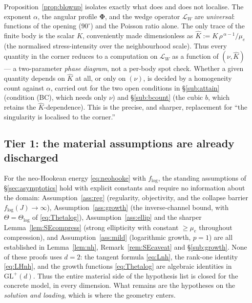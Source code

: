 \begin{remark}
    \label{rem:sifparam}
    Proposition~\ref{prop:blowup} isolates exactly what does and does not localise. The exponent $\alpha$, the angular
    profile $\bm{\Phi}$, and the wedge operator $\mathcal{L}_W$ are \emph{universal}: functions of the opening
    ($90^\circ$) and the Poisson ratio alone. The only trace of the finite body is the scalar $K$, conveniently made
    dimensionless as $\hat K:=K\,\rho^{\,\alpha-1}/\mu_e$ (the normalised stress-intensity over the neighbourhood scale).
    Thus every quantity in the corner reduces to a computation on $\mathcal{L}_W$ as a function of $(\nu,\hat K)$ --- a
    two-parameter \emph{phase diagram}, not a per-body spot check. Whether a given quantity depends on $\hat K$ at all,
    or only on $(\nu)$, is decided by a homogeneity count against $\alpha$, carried out for the two open conditions in
    \S\ref{sub:attain} (condition (BC), which needs only $\nu$) and \S\ref{sub:bcount} (the cubic $b$, which retains the
    $\hat K$-dependence). This is the precise, and sharper, replacement for ``the singularity is localised to the
    corner.''
\end{remark}

\subsection{Tier 1: the material assumptions are already discharged}
\label{sub:tier1}

For the neo-Hookean energy \eqref{eq:neohooke} with $f_{\log}$, the standing assumptions of \S\ref{sec:asymptotics}
hold with explicit constants and require no information about the domain: Assumption~\ref{ass:reg} (regularity,
objectivity, and the collapse barrier $f_{\log}(J)\to\infty$), Assumption~\ref{ass:growth} (the inverse-channel bound,
with $\Theta=\Theta_{\log}$ of \eqref{eq:Thetalog}), Assumption~\ref{ass:ellip} and the sharper
Lemma~\ref{lem:SEcompress} (strong ellipticity with constant $\ge\mu_e$ throughout compression), and
Assumption~\ref{ass:mild} (logarithmic growth, $p=1$) are all established in Lemma~\ref{lem:nh},
Remark~\ref{rem:SEcaveat} and \S\ref{sub:growth}. None of these proofs uses $d=2$: the tangent formula \eqref{eq:Lnh},
the rank-one identity \eqref{eq:LHnh}, and the growth functions \eqref{eq:Thetalog} are algebraic identities in
$\mathrm{GL}^+(d)$. Thus the entire material side of the hypothesis list is closed for the concrete model, in every
dimension. What remains are the hypotheses on the \emph{solution and loading}, which is where the geometry enters.

